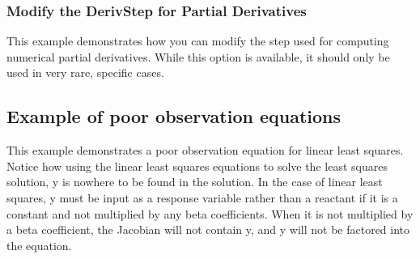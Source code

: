\documentclass{article}
\begin{document}
	\clearpage
	\subsubsection*{Modify the DerivStep for Partial Derivatives}
	This example demonstrates how you can modify the step used for computing numerical partial derivatives.  While this option is available, it should only be used in very rare, specific cases.
	
	
	
	\clearpage
	\subsection*{Example of poor observation equations}
	This example demonstrates a poor observation equation for linear least squares.  Notice how using the linear least squares equations to solve the least squares solution, y is nowhere to be found in the solution.  In the case of linear least squares, y must be input as a response variable rather than a reactant if it is a constant and not multiplied by any beta coefficients.  When it is not multiplied by a beta coefficient, the Jacobian will not contain y, and y will not be factored into the equation.
	
\end{document}
